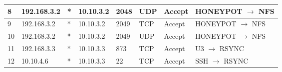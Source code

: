 \documentclass[a4paper, 11pt, oneside]{article}
\begin{document}
\begin{table}[H]
{\begin{tabular}{|llllllll|}
\multicolumn{1}{|l|}{8}           & \multicolumn{1}{l|}{192.168.3.2}                                                  & \multicolumn{1}{l|}{*}                                                              & \multicolumn{1}{l|}{10.10.3.2}                                                        & \multicolumn{1}{l|}{2048}                                                                & \multicolumn{1}{l|}{UDP}               & \multicolumn{1}{l|}{Accept}          & HONEYPOT $\rightarrow$ NFS             \\ \hline
\multicolumn{1}{|l|}{9}           & \multicolumn{1}{l|}{192.168.3.2}                                                  & \multicolumn{1}{l|}{*}                                                              & \multicolumn{1}{l|}{10.10.3.2}                                                        & \multicolumn{1}{l|}{2049}                                                                & \multicolumn{1}{l|}{TCP}               & \multicolumn{1}{l|}{Accept}          & HONEYPOT $\rightarrow$ NFS             \\ \hline
\multicolumn{1}{|l|}{10}          & \multicolumn{1}{l|}{192.168.3.2}                                                  & \multicolumn{1}{l|}{*}                                                              & \multicolumn{1}{l|}{10.10.3.2}                                                        & \multicolumn{1}{l|}{2049}                                                                & \multicolumn{1}{l|}{UDP}               & \multicolumn{1}{l|}{Accept}          & HONEYPOT $\rightarrow$ NFS             \\ \hline
\multicolumn{1}{|l|}{11}          & \multicolumn{1}{l|}{192.168.3.3}                                                  & \multicolumn{1}{l|}{*}                                                              & \multicolumn{1}{l|}{10.10.3.3}                                                         & \multicolumn{1}{l|}{873}                                                                 & \multicolumn{1}{l|}{TCP}               & \multicolumn{1}{l|}{Accept}          & U3 $\rightarrow$ RSYNC                 \\ \hline
\multicolumn{1}{|l|}{12}          & \multicolumn{1}{l|}{10.10.4.6}                                                    & \multicolumn{1}{l|}{*}                                                              & \multicolumn{1}{l|}{10.10.3.3}                                                      & \multicolumn{1}{l|}{22}                                                                  & \multicolumn{1}{l|}{TCP}               & \multicolumn{1}{l|}{Accept}          & SSH $\rightarrow$ RSYNC                \\ \hline

\end{tabular}}
\end{table}
\end{document}
